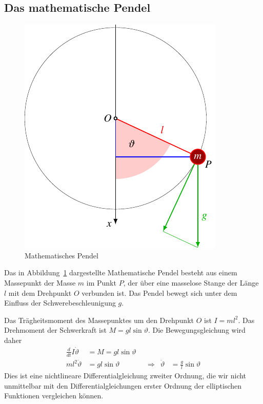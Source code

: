 \subsection{Das mathematische Pendel
\label{buch:elliptisch:subsection:mathpendel}}
\begin{figure}
\centering
\includegraphics{chapters/110-elliptisch/images/pendel.pdf}
\caption{Mathematisches Pendel
\label{buch:elliptisch:fig:mathpendel}}
\end{figure}
Das in Abbildung~\ref{buch:elliptisch:fig:mathpendel} dargestellte
Mathematische Pendel besteht aus einem Massepunkt der Masse $m$
im Punkt $P$,
der über eine masselose Stange der Länge $l$ mit dem Drehpunkt $O$
verbunden ist.
Das Pendel bewegt sich unter dem Einfluss der Schwerebeschleunigung $g$.

Das Trägheitsmoment des Massepunktes um den Drehpunkt $O$ ist
\(
I=ml^2
\).
Das Drehmoment der Schwerkraft ist
\(M=gl\sin\vartheta\).
Die Bewegungsgleichung wird daher
\[
\begin{aligned}
\frac{d}{dt} I\dot{\vartheta}
&=
M
=
gl\sin\vartheta
\\
ml^2\ddot{\vartheta}
&=
gl\sin\vartheta
&&\Rightarrow&
\ddot{\vartheta}
&=\frac{g}{l}\sin\vartheta
\end{aligned}
\]
Dies ist eine nichtlineare Differentialgleichung zweiter Ordnung, die
wir nicht unmittelbar mit den Differentialgleichungen erster Ordnung
der elliptischen Funktionen vergleichen können.

